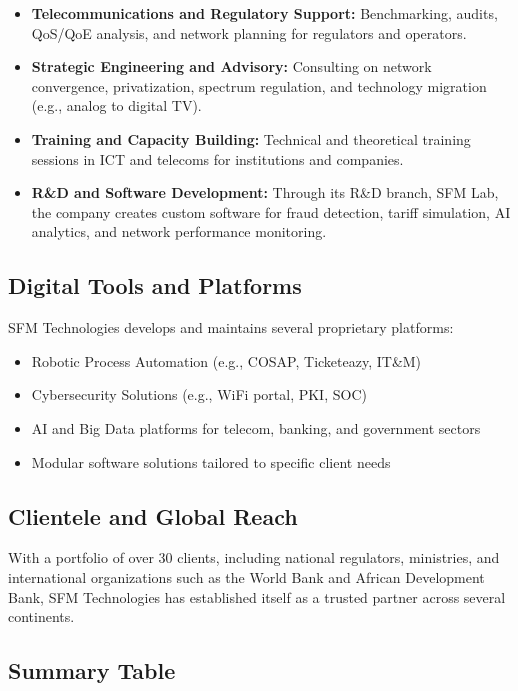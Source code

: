 \documentclass[12pt,a4paper]{article}
\begin{document}
\begin{itemize}
  \item \textbf{Telecommunications and Regulatory Support:} Benchmarking, audits, QoS/QoE analysis, and network planning for regulators and operators.
  \item \textbf{Strategic Engineering and Advisory:} Consulting on network convergence, privatization, spectrum regulation, and technology migration (e.g., analog to digital TV).
  \item \textbf{Training and Capacity Building:} Technical and theoretical training sessions in ICT and telecoms for institutions and companies.
  \item \textbf{R\&D and Software Development:} Through its R\&D branch, SFM Lab, the company creates custom software for fraud detection, tariff simulation, AI analytics, and network performance monitoring.
\end{itemize}

\subsection{Digital Tools and Platforms}
SFM Technologies develops and maintains several proprietary platforms:

\begin{itemize}
  \item Robotic Process Automation (e.g., COSAP, Ticketeazy, IT\&M)
  \item Cybersecurity Solutions (e.g., WiFi portal, PKI, SOC)
  \item AI and Big Data platforms for telecom, banking, and government sectors
  \item Modular software solutions tailored to specific client needs
\end{itemize}

\subsection{Clientele and Global Reach}
With a portfolio of over 30 clients, including national regulators, ministries, and international organizations such as the World Bank and African Development Bank, SFM Technologies has established itself as a trusted partner across several continents.

\subsection{Summary Table}
\end{document}
